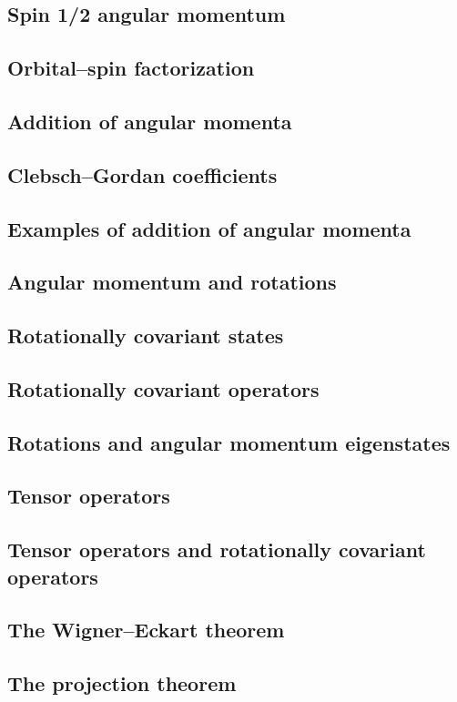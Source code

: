 \documentclass{article}
\begin{document}
\subsection{Spin 1/2 angular momentum}
\subsection{Orbital–spin factorization}
\subsection{Addition of angular momenta}
\subsection{Clebsch–Gordan coefficients}
\subsection{Examples of addition of angular momenta}
\subsection{Angular momentum and rotations}
\subsection{Rotationally covariant states}
\subsection{Rotationally covariant operators}
\subsection{Rotations and angular momentum eigenstates}
\subsection{Tensor operators}
\subsection{Tensor operators and rotationally covariant operators}
\subsection{The Wigner–Eckart theorem}
\subsection{The projection theorem}
\end{document}
